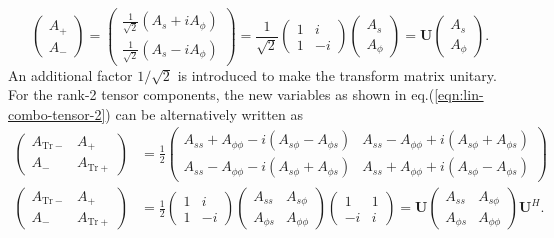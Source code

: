 \begin{equation}\label{eqn:cg-vector-transform}
    \begin{pmatrix} A_+ \\ A_- \end{pmatrix} = 
    \begin{pmatrix} \frac{1}{\sqrt{2}} (A_s + i A_\phi) \\ \frac{1}{\sqrt{2}} (A_s - i A_\phi) \end{pmatrix} = \frac{1}{\sqrt{2}}
    \begin{pmatrix}
        1 & i \\ 
        1 & -i
    \end{pmatrix}
    \begin{pmatrix} A_s \\ A_\phi \end{pmatrix} 
    = \mathbf{U} \begin{pmatrix} A_s \\ A_\phi \end{pmatrix}.
\end{equation}
An additional factor $1/\sqrt{2}$ is introduced to make the transform matrix unitary. For the rank-2 tensor components, the new variables as shown in eq.(\ref{eqn:lin-combo-tensor-2}) can be alternatively written as
\begin{equation}\label{eqn:cg-tensor2-transform}
\begin{aligned}
    \begin{pmatrix}
        A_{\mathrm{Tr}-} & A_+ \\ 
        A_- & A_{\mathrm{Tr}+}
    \end{pmatrix} &= \frac{1}{2} \begin{pmatrix}
        A_{ss} + A_{\phi\phi} - i \left(A_{s\phi} - A_{\phi s}\right) & A_{ss} - A_{\phi\phi} + i \left(A_{s\phi} + A_{\phi s}\right) \\ 
        A_{ss} - A_{\phi\phi} - i \left(A_{s\phi} + A_{\phi s}\right) &  A_{ss} + A_{\phi \phi} + i \left(A_{s\phi} - A_{\phi s}\right)
    \end{pmatrix} \\ 
    \begin{pmatrix}
        A_{\mathrm{Tr}-} & A_+ \\ 
        A_- & A_{\mathrm{Tr}+}
    \end{pmatrix} &= \frac{1}{2} \begin{pmatrix} 1 & i \\ 1 & -i \end{pmatrix} 
    \begin{pmatrix} A_{ss} & A_{s\phi} \\ A_{\phi s} & A_{\phi\phi} \end{pmatrix}
    \begin{pmatrix} 1 & 1 \\ -i & i \end{pmatrix}
    = \mathbf{U} \begin{pmatrix} A_{ss} & A_{s\phi} \\ A_{\phi s} & A_{\phi\phi} \end{pmatrix} \mathbf{U}^H.
\end{aligned}
\end{equation}
